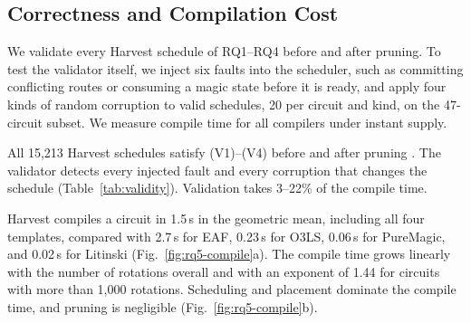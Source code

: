 
\subsection{Correctness and Compilation Cost}
\label{sec:eval-validity}





We validate every Harvest schedule of RQ1--RQ4 before and after pruning.
To test the validator itself, we inject six faults into the scheduler, such as committing conflicting routes or consuming a magic state before it is ready, and apply four kinds of random corruption to valid schedules, 20 per circuit and kind, on the 47-circuit subset.
We measure compile time for all compilers under instant supply.

All 15{,}213 Harvest schedules satisfy (V1)--(V4) before and after pruning .
The validator detects every injected fault and every corruption that changes the schedule (Table~\ref{tab:validity}).
Validation takes 3--22\% of the compile time.

Harvest compiles a circuit in 1.5\,s in the geometric mean, including all four templates, compared with 2.7\,s for EAF, 0.23\,s for O3LS, 0.06\,s for PureMagic, and 0.02\,s for Litinski (Fig.~\ref{fig:rq5-compile}a).
The compile time grows linearly with the number of rotations overall and with an exponent of 1.44 for circuits with more than 1{,}000 rotations.
Scheduling and placement dominate the compile time, and pruning is negligible (Fig.~\ref{fig:rq5-compile}b).

